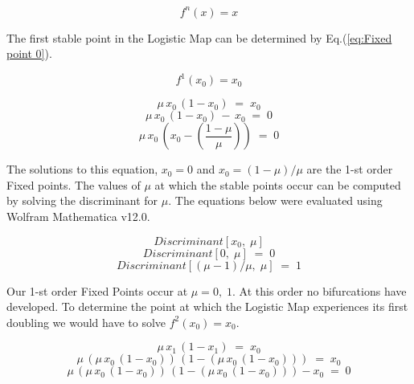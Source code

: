 \begin{equation}
    \label{eq:Fixed point}
    f^n(x) = x 
\end{equation}

The first stable point in the Logistic Map can be determined by Eq.(\ref{eq:Fixed point 0}).

\begin{equation}
    \label{eq:Fixed point 0}
    f^1(x_0) = x_0
\end{equation}

\begin{equation}
    \mu\,x_0\,(1-x_0)\;=\;x_0
\end{equation}
\begin{equation}
    \mu\,x_0\,(1-x_0)\,-\,x_0 \;=\;0
\end{equation}
\begin{equation}
    \mu\,x_0\,\left(x_0 - \left(\frac{1-\mu}{\mu}\right)\right)\;=\;0
\end{equation}

The solutions to this equation, $x_0 = 0$ and $x_0 = (1-\mu)/\mu$ are the 1-st order
Fixed points. The values of $\mu$ at which the stable points occur can be computed by
solving the discriminant for $\mu$. The equations below were evaluated using
Wolfram Mathematica v12.0.

\begin{equation}
Discriminant[x_0,\;\mu]
\end{equation}
\begin{equation}
Discriminant[0,\;\mu]\;=\;0
\end{equation}
\begin{equation}
Discriminant[(\mu-1)/\mu,\;\mu]\;=\;1
\end{equation}

Our 1-st order Fixed Points occur at $\mu = 0,\;1$. At this order no bifurcations
have developed. To determine the point at which the Logistic Map experiences its first
doubling we would have to solve $f^2(x_0) = x_0$.

\begin{equation}
\mu\,x_1\,(1-x_1)\;=\;x_0
\end{equation}
\begin{equation}
\mu\,(\mu\,x_0\,(1-x_0))\,(1-(\mu\,x_0\,(1-x_0)))\;=\;x_0
\end{equation}
\begin{equation}
\mu\,(\mu\,x_0\,(1-x_0))\,(1-(\mu\,x_0\,(1-x_0)))-x_0\;=\;0
\end{equation}

